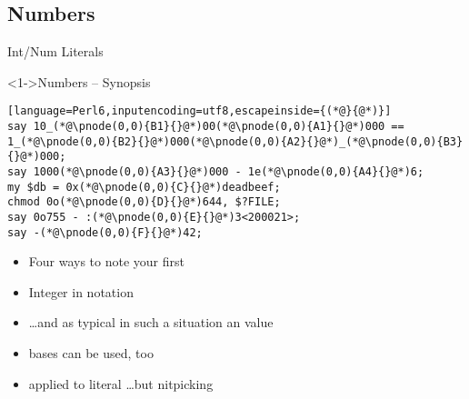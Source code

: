 \subsection{Numbers}

\begin{frame}[fragile]{Int/Num Literals}
\begin{block}<1->{Numbers -- Synopsis}
\small
\begin{lstlisting}[language=Perl6,inputencoding=utf8,escapeinside={(*@}{@*)}]
say 10_(*@\pnode(0,0){B1}{}@*)00(*@\pnode(0,0){A1}{}@*)000 == 1_(*@\pnode(0,0){B2}{}@*)000(*@\pnode(0,0){A2}{}@*)_(*@\pnode(0,0){B3}{}@*)000;
say 1000(*@\pnode(0,0){A3}{}@*)000 - 1e(*@\pnode(0,0){A4}{}@*)6;
my $db = 0x(*@\pnode(0,0){C}{}@*)deadbeef;
chmod 0o(*@\pnode(0,0){D}{}@*)644, $?FILE;
say 0o755 - :(*@\pnode(0,0){E}{}@*)3<200021>;
say -(*@\pnode(0,0){F}{}@*)42;
\end{lstlisting}

\end{block}

\begin{itemize}
\item<2-> Four ways to note your first  
\item<4-> Integer in  notation
\item<5-> \ldots and as typical in such a situation an  value
\item<6->  bases can be used, too
\item<7->  applied to literal \ldots but nitpicking
\end{itemize}
\end{frame}

